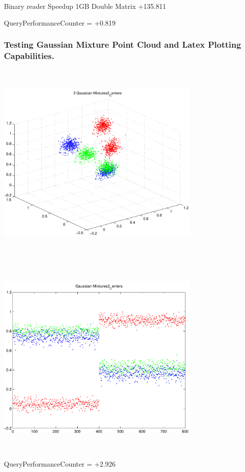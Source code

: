 \documentclass[9pt]{article}
\theoremstyle{plain}
\theoremstyle{definition}
\theoremstyle{remark}
\numberwithin{equation}{section}
\begin{document}
Binary reader Speedup 1GB Double Matrix +135.811

QueryPerformanceCounter  =  +0.819
\subsubsection{Testing Gaussian Mixture Point Cloud and Latex Plotting Capabilities.}
\includegraphics[width=10.0cm,height=10.0cm]{GaussianMixture_Dim_3_Centers2.pdf}

\includegraphics[width=10.0cm,height=10.0cm]{GaussianMixture_Dim_1_Centers2.pdf}

QueryPerformanceCounter  =  +2.926
\end{document}
